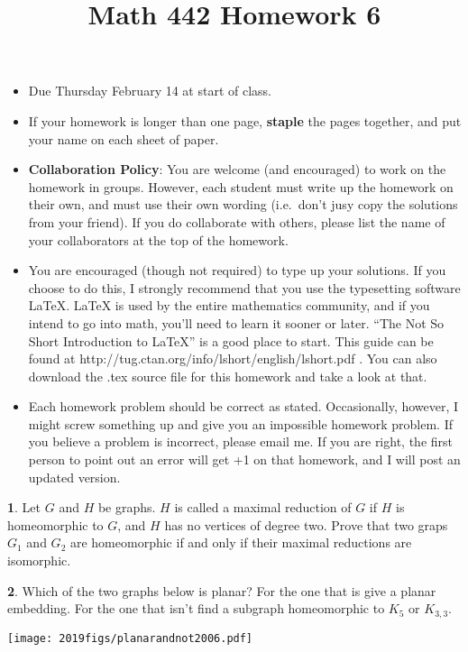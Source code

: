 \documentclass[12pt]{article}
\title{\vspace{-2.0cm}Math 442 Homework 6}
\date{}
\theoremstyle{definition}
\newtheorem{problem}{}
\begin{document}
%
%
\maketitle
%
\vspace{-16 mm}
\begin{itemize}
\item Due Thursday February 14 at start of class.
%
\item If your homework is longer than one page, {\bf staple} the pages together, and put your name on each sheet of paper.
%
\item {\bf Collaboration Policy}: You are welcome (and encouraged) to work on the homework in groups. However, each student must write up the homework on their own, and must use their own wording (i.e.~don't jusy copy the solutions from your friend). If you do collaborate with others, please list the name of your collaborators at the top of the homework.

\item You are encouraged (though not required) to type up your solutions. If you choose to do this, I strongly recommend that you use the typesetting software LaTeX. LaTeX is used by the entire mathematics community, and if you intend to go into math, you’ll need to learn it sooner or later. ``The Not So Short Introduction to LaTeX'' is a good place to start. This guide can be found at http://tug.ctan.org/info/lshort/english/lshort.pdf . You can also download the .tex source file for this homework and take a look at that.

\item Each homework problem should be correct as stated. Occasionally, however, I might screw something up and give you an impossible homework problem. If you believe a problem is incorrect, please email me. If you are right, the first person to point out an error will get +1 on that homework, and I will post an updated version. 
\end{itemize}
\begin{problem}
Let $G$ and $H$ be graphs. $H$ is called a maximal reduction of $G$ if $H$ is homeomorphic to $G$, and $H$ has no vertices of degree two. Prove that two graps $G_1$ and $G_2$ are homeomorphic if and only if their maximal reductions are isomorphic.  
\end{problem}

\begin{problem}
Which of the two graphs below is planar? For the one that is give a planar embedding. For the one that isn't find a subgraph homeomorphic to $K_5$ or $K_{3,3}$.\\
\centerline{\texttt{[image: 2019figs/planarandnot2006.pdf]}}
\end{problem}
\end{document}
